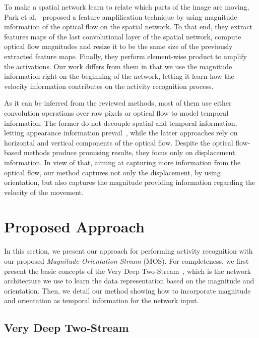 \documentclass[10pt,conference]{IEEEtran}
\begin{document}
To make a spatial network learn to relate which parts of the image are moving, Park et al.~\cite{Park:2016} proposed a feature amplification technique by using magnitude information of the optical flow on the spatial network. To that end, they extract features maps of the last convolutional layer of the spatial network, compute optical flow magnitudes and resize it to be the same size of the previously extracted feature maps. Finally, they perform element-wise product to amplify the activations. Our work differs from them in that we use the magnitude information right on the beginning of the network, letting it learn how the velocity information contributes on the activity recognition process.

As it can be inferred from the reviewed methods, most of them use either convolution operations over raw pixels or optical flow to model temporal information. The former do not decouple spatial and temporal information, letting appearance information prevail~\cite{Feichtenhofer:2016}, while the latter approaches rely on horizontal and vertical components of the optical flow. Despite the optical flow-based methods produce promising results, they focus only on displacement information. In view of that, aiming at capturing more information from the optical flow, our method captures not only the displacement, by using orientation, but also captures the magnitude providing information regarding the velocity of the movement.

%
\section{Proposed Approach}\label{approach}


In this section, we present our approach for performing activity recognition with our proposed \emph{Magnitude-Orientation Stream} (MOS). For completeness, we first present the basic concepts of the Very Deep Two-Stream~\cite{Wang:2015}, which is the network architecture we use to learn the data representation based on the magnitude and orientation. Then, we detail our method showing how to incorporate magnitude and orientation as temporal information for the network input.

\subsection{Very Deep Two-Stream}
\end{document}
